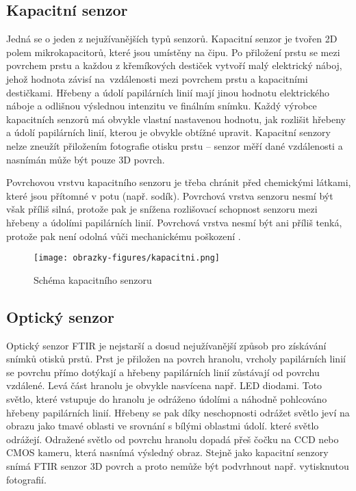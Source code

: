 \subsection*{Kapacitní senzor}
Jedná se o jeden z nejužívanějších typů senzorů. Kapacitní senzor je tvořen 2D polem mikrokapacitorů, které jsou umístěny na čipu. Po přiložení prstu se mezi povrchem prstu a každou z křemíkových destiček vytvoří malý elektrický náboj, jehož hodnota závisí na~vzdálenosti mezi povrchem prstu a kapacitními destičkami. Hřebeny a údolí papilárních linií mají jinou hodnotu elektrického náboje a odlišnou výslednou intenzitu ve finálním snímku. Každý výrobce kapacitních senzorů má obvykle vlastní nastavenou hodnotu, jak rozlišit hřebeny a údolí papilárních linií, kterou je obvykle obtížné upravit. Kapacitní senzory nelze zneužít přiložením fotografie otisku prstu -- senzor měří dané vzdálenosti a nasnímán může být pouze 3D povrch. 

Povrchovou vrstvu kapacitního senzoru je třeba chránit před chemickými látkami, které jsou přítomné v potu (např. sodík). Povrchová vrstva senzoru nesmí být však příliš silná, protože pak je snížena rozlišovací schopnost senzoru mezi hřebeny a údolími papilárních linií. Povrchová vrstva nesmí být ani příliš tenká, protože pak není odolná vůči mechanickému poškození \cite{Maltoni2009}. 

\begin{figure}[!htbp]
    \centering
    \texttt{[image: obrazky-figures/kapacitni.png]}
    \caption{Schéma kapacitního senzoru \cite{Maltoni2009}}
\end{figure}

\subsection*{Optický senzor}
Optický senzor FTIR je nejstarší a dosud nejužívanější způsob pro získávání snímků otisků prstů. Prst je přiložen na povrch hranolu, vrcholy papilárních linií se povrchu přímo dotýkají a hřebeny papilárních linií zůstávají od povrchu vzdálené. Levá část hranolu je obvykle nasvícena např. LED diodami. Toto světlo, které vstupuje do hranolu je odráženo údolími a náhodně pohlcováno hřebeny papilárních linií. Hřebeny se pak díky neschopnosti odrážet světlo jeví na obrazu jako tmavé oblasti ve srovnání s bílými oblastmi údolí. které světlo odrážejí. Odražené světlo od povrchu hranolu dopadá přeš čočku na CCD nebo CMOS kameru, která nasnímá výsledný obraz. Stejně jako kapacitní senzory snímá FTIR senzor 3D povrch a proto nemůže být podvrhnout např. vytisknutou fotografií.

